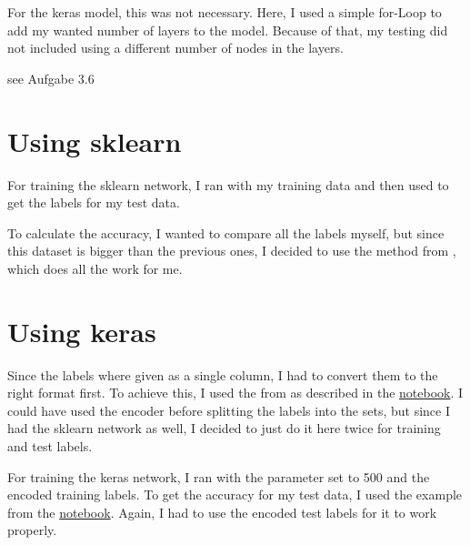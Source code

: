 	For the keras model, this was not necessary. Here, I used a simple for-Loop to add my wanted number of layers to the model. Because of that, my testing did not included using a different number of nodes in the layers.
	
	\clearpage
	
	\task[]
	
	see Aufgabe 3.6
	
	\task[]
	
	\section{Using sklearn}
	
	For training the sklearn network, I ran  with my training data and then used  to get the labels for my test data.
	
	To calculate the accuracy, I wanted to compare all the labels myself, but since this dataset is bigger than the previous ones, I decided to use the  method from , which does all the work for me.
	
	
	
	
	\section{Using keras}
	
	 Since the labels where given as a single column, I had to convert them to the right format first. To achieve this, I used the  from  as described in the \href{http://nbviewer.jupyter.org/urls/dl.dropboxusercontent.com/s/39lgz8g2cs0jn44/Lect_04_Supervised_learning.ipynb}{notebook}. I could have used the encoder before splitting the labels into the sets, but since I had the sklearn network as well, I decided to just do it here twice for training and test labels.
	 
	 
	 For training the keras network, I ran  with the  parameter set to 500 and the encoded training labels. To get the accuracy for my test data, I used the example from the \href{http://nbviewer.jupyter.org/urls/dl.dropboxusercontent.com/s/39lgz8g2cs0jn44/Lect_04_Supervised_learning.ipynb}{notebook}. Again, I had to use the encoded test labels for it to work properly.
	
	
